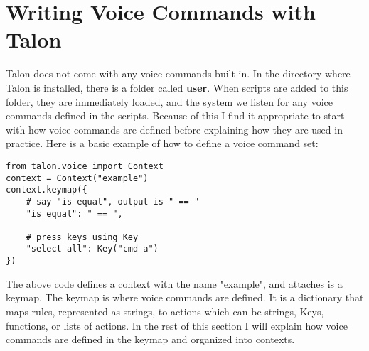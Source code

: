 \documentclass[a4paper,english]{ifimaster}
\begin{document}
\section{Writing Voice Commands with Talon}
Talon does not come with any voice commands built-in.
In the directory where Talon is installed, there is a folder called \textbf{user}.
When scripts are added to this folder, they are immediately loaded, and the system we listen for any voice commands defined in the scripts.
Because of this I find it appropriate to start with how voice commands are defined before explaining how they are used in practice.
Here is a basic example of how to define a voice command set:

\begin{verbatim}
from talon.voice import Context
context = Context("example")
context.keymap({
	# say "is equal", output is " == "
	"is equal": " == ",

	# press keys using Key
	"select all": Key("cmd-a")
})
\end{verbatim}
The above code defines a context with the name "example", and attaches is a keymap.
The keymap is where voice commands are defined.
It is a dictionary that maps rules, represented as strings, to actions which can be strings, Keys, functions, or lists of actions.
In the rest of this section I will explain how voice commands are defined in the keymap
and organized into contexts.
\end{document}
